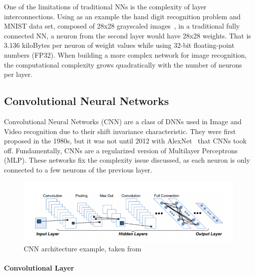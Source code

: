 One of the limitations of traditional NNs is the complexity of layer
interconnections. Using as an example the hand digit recognition problem and MNIST
data set, composed of 28x28 grayscaled images~\cite{mnist:digits}, in a
traditional fully connected NN, a neuron from the second layer would have 28x28
weights. That is 3.136 kiloBytes per neuron of weight values while using 32-bit
floating-point numbers (FP32). When building a more complex network for image
recognition, the computational complexity grows quadratically with the number
of neurons per layer.


\subsection{Convolutional Neural Networks}
\label{section:subcnn}

Convolutional Neural Networks (CNN) are a class of DNNs used in Image and Video
recognition due to their shift invariance characteristic. They were first
proposed in the 1980s, but it was not until 2012 with AlexNet~\cite{alexnet} that
CNNs took off. Fundamentally, CNNs are a regularized version of
Multilayer Perceptrons (MLP). These networks fix the complexity issue discussed, as each neuron is only connected to a few neurons of the previous layer.
 

 \begin{figure}[!htbp]
    \centering
    \includegraphics[width=1\textwidth]{Figures/convolutionlayer.png}
    \caption{CNN architecture example, taken from~\cite{cgracnn}}
    \label{CNNl}
\end{figure} 



 \paragraph{Convolutional Layer}
\label{section:convlayer}

